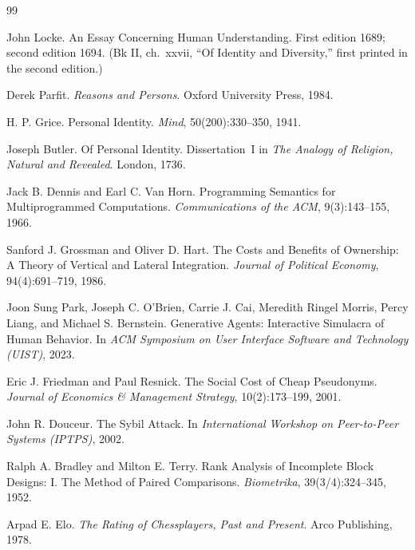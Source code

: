 \documentclass[11pt,a4paper]{article}
\theoremstyle{definition}
\begin{document}

\pdprintsolutions
\begin{thebibliography}{99}

John Locke.
\newblock An Essay Concerning Human Understanding.
\newblock First edition 1689; second edition 1694. (Bk II, ch.\ xxvii, ``Of Identity and Diversity,'' first printed in the second edition.)

Derek Parfit.
\newblock \textit{Reasons and Persons}.
\newblock Oxford University Press, 1984.

H. P. Grice.
\newblock Personal Identity.
\newblock \textit{Mind}, 50(200):330--350, 1941.

Joseph Butler.
\newblock Of Personal Identity.
\newblock Dissertation~I in \textit{The Analogy of Religion, Natural and Revealed}. London, 1736.

Jack B. Dennis and Earl C. Van Horn.
\newblock Programming Semantics for Multiprogrammed Computations.
\newblock \textit{Communications of the ACM}, 9(3):143--155, 1966.

Sanford J. Grossman and Oliver D. Hart.
\newblock The Costs and Benefits of Ownership: A Theory of Vertical and Lateral Integration.
\newblock \textit{Journal of Political Economy}, 94(4):691--719, 1986.

Joon Sung Park, Joseph C. O'Brien, Carrie J. Cai, Meredith Ringel Morris, Percy Liang, and Michael S. Bernstein.
\newblock Generative Agents: Interactive Simulacra of Human Behavior.
\newblock In \textit{ACM Symposium on User Interface Software and Technology (UIST)}, 2023.

Eric J. Friedman and Paul Resnick.
\newblock The Social Cost of Cheap Pseudonyms.
\newblock \textit{Journal of Economics \& Management Strategy}, 10(2):173--199, 2001.

John R. Douceur.
\newblock The Sybil Attack.
\newblock In \textit{International Workshop on Peer-to-Peer Systems (IPTPS)}, 2002.

Ralph A. Bradley and Milton E. Terry.
\newblock Rank Analysis of Incomplete Block Designs: I. The Method of Paired Comparisons.
\newblock \textit{Biometrika}, 39(3/4):324--345, 1952.

Arpad E. Elo.
\newblock \textit{The Rating of Chessplayers, Past and Present}.
\newblock Arco Publishing, 1978.


\end{thebibliography}
\end{document}
